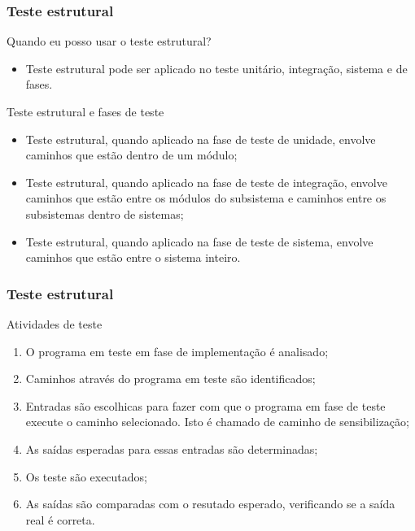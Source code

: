 \begin{frame}
\frametitle{Teste estrutural}

\begin{block:fact}{Quando eu posso usar o teste estrutural?}
\begin{itemize}
	\item Teste estrutural pode ser aplicado no teste unitário, integração, sistema e de fases.
\end{itemize}
\end{block:fact}


\begin{block:fact}{Teste estrutural e fases de teste}
\begin{itemize}
	\item Teste estrutural, quando aplicado na fase de teste de unidade, envolve caminhos que estão dentro de um módulo;

	\item Teste estrutural, quando aplicado na fase de teste de integração, envolve caminhos que estão entre os módulos do subsistema e caminhos entre os subsistemas dentro de sistemas;

	\item Teste estrutural, quando aplicado na fase de teste de sistema, envolve caminhos que estão entre o sistema inteiro.
	
\end{itemize}
\end{block:fact}
\end{frame}


\begin{frame}
\frametitle{Teste estrutural}

\begin{block:procedure}{Atividades de teste}
\begin{enumerate}
	\item O programa em teste em fase de implementação é analisado;
	\item Caminhos através do programa em teste são identificados;
	\item Entradas são escolhicas para fazer com que o programa em fase de teste execute o caminho selecionado. Isto é chamado de caminho de sensibilização;
	\item As saídas esperadas para essas entradas são determinadas;
	\item Os teste são executados;
	\item As saídas são comparadas com o resutado esperado, verificando se a saída real é correta.
\end{enumerate}
\end{block:procedure}
\end{frame}